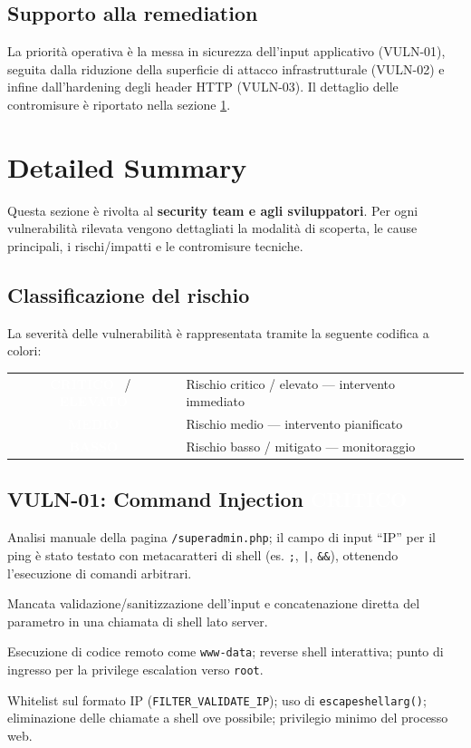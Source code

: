 \documentclass[11pt]{article}
\newcommand{\sev}[2]{%
  \setlength{\fboxsep}{3pt}%
  \colorbox{#1}{\textcolor{white}{\small\textbf{#2}}}%
}
\newcommand{\sevCRIT}{\sev{sevCritico}{CRITICO}}
\newcommand{\sevHIGH}{\sev{sevElevato}{ELEVATO}}
\newcommand{\sevMED}{\sev{sevMedio}{MEDIO}}
\newcommand{\sevLOW}{\sev{sevBasso}{BASSO}}
\begin{document}
\subsection{Supporto alla remediation}
La priorità operativa è la messa in sicurezza dell'input applicativo (VULN-01), seguita dalla riduzione della superficie di attacco infrastrutturale (VULN-02) e infine dall'hardening degli header HTTP (VULN-03). Il dettaglio delle contromisure è riportato nella sezione \ref{sec:detailed}.


\section{Detailed Summary}
\label{sec:detailed}
Questa sezione è rivolta al \textbf{security team e agli sviluppatori}. Per ogni vulnerabilità rilevata vengono dettagliati la modalità di scoperta, le cause principali, i rischi/impatti e le contromisure tecniche.

\subsection{Classificazione del rischio}
La severità delle vulnerabilità è rappresentata tramite la seguente codifica a colori:
\begin{center}
\begin{tabular}{c l}
\sevCRIT~/~\sevHIGH & Rischio critico / elevato — intervento immediato \\[4pt]
\sevMED & Rischio medio — intervento pianificato \\[4pt]
\sevLOW & Rischio basso / mitigato — monitoraggio \\
\end{tabular}
\end{center}

\subsection{VULN-01: Command Injection \hfill \sevCRIT}
\begin{description}[leftmargin=2.4cm, style=nextline]
    \item[Scoperta] Analisi manuale della pagina \texttt{/superadmin.php}; il campo di input ``IP'' per il ping è stato testato con metacaratteri di shell (es. \texttt{;}, \texttt{|}, \texttt{\&\&}), ottenendo l'esecuzione di comandi arbitrari.
    \item[Cause] Mancata validazione/sanitizzazione dell'input e concatenazione diretta del parametro in una chiamata di shell lato server.
    \item[Rischi e impatti] Esecuzione di codice remoto come \texttt{www-data}; reverse shell interattiva; punto di ingresso per la privilege escalation verso \texttt{root}.
    \item[Contromisure] Whitelist sul formato IP (\texttt{FILTER\_VALIDATE\_IP}); uso di \texttt{escapeshellarg()}; eliminazione delle chiamate a shell ove possibile; privilegio minimo del processo web.
\end{description}
\end{document}
